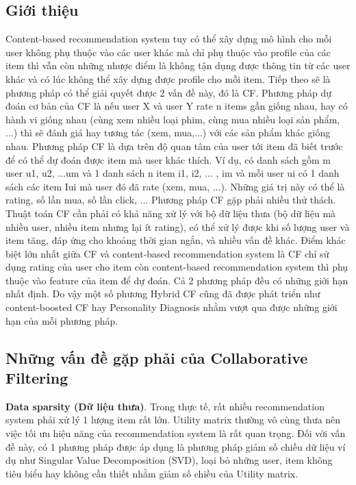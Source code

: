 \subsection{Giới thiệu}
Content-based recommendation system tuy có thể xây dựng mô hình cho mỗi user không phụ thuộc vào các user khác mà chỉ phụ thuộc vào profile của các item thì vẫn còn những nhược điểm là không tận dụng được thông tin từ các user khác và có lúc không thể xây dựng được profile cho mỗi item. Tiếp theo sẽ là phương pháp có thể giải quyết được 2 vấn đề này, đó là \gls{CF}.
\newline Phương pháp dự đoán cơ bản của CF là nếu user X và user Y rate n items gần giống nhau, hay có hành vi giống nhau (cùng xem nhiều loại phim, cùng mua nhiều loại sản phẩm, ...) thì sẽ đánh giá hay tương tác (xem, mua,...) với các sản phẩm khác giống nhau. 
\newline Phương pháp CF là dựa trên độ quan tâm của user tới item đã biết trước để có thể dự đoán được item mà user khác thích. Ví dụ, có danh sách gồm m user {u1, u2, ...um} và 1 danh sách n item {i1, i2, ... , im} và mỗi user ui có 1 danh sách các item Iui mà user đó đã rate (xem, mua, ...). Những giá trị này có thể là rating, số lần mua, số lần click, ... 
\newline Phương pháp CF gặp phải nhiều thử thách. Thuật toán CF cần phải có khả năng xử lý với bộ dữ liệu thưa (bộ dữ liệu mà nhiều user, nhiều item nhưng lại ít rating), có thể xử lý được khi số lượng user và item tăng, đáp ứng cho khoảng thời gian ngắn, và nhiều vấn đề khác.
\newline Điểm khác biệt lớn nhất giữa CF và content-based recommendation system là CF chỉ sử dụng rating của user cho item còn content-based recommendation system thì phụ thuộc vào feature của item để dự đoán. Cả 2 phương pháp đều có những giới hạn nhất định. Do vậy một số phương Hybrid CF cũng đã được phát triển như content-boosted CF hay Personality Diagnosis nhằm vượt qua được những giới hạn của mỗi phương pháp.

\subsection{Những vấn đề gặp phải của Collaborative Filtering}
\textbf{Data sparsity (Dữ liệu thưa)}. Trong thực tế, rất nhiều recommendation system phải xử lý 1 lượng item rất lớn. Utility matrix thường vô cùng thưa nên việc tối ưu hiệu năng của recommendation system là rất quan trọng. Đối với vấn đề này, có 1 phương pháp được áp dụng là phương pháp giảm số chiều dữ liệu ví dụ như Singular Value Decomposition (SVD), loại bỏ những user, item không tiêu biểu hay không cần thiết nhằm giảm số chiều của Utility matrix.


